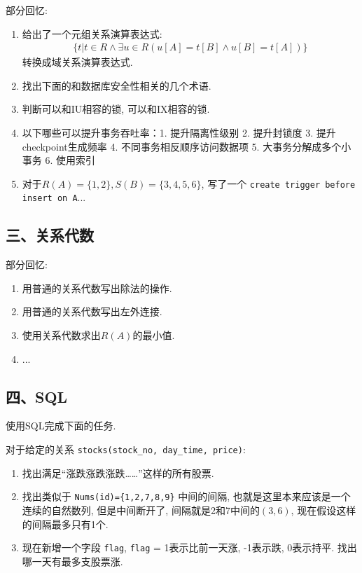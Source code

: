 部分回忆:
\begin{enumerate}
    \item 给出了一个元组关系演算表达式:
    \begin{align*}
        \{t|t\in R \land \exists u \in R(u[A]=t[B]\land u[B]=t[A])\}
    \end{align*}
    转换成域关系演算表达式.
    \item 找出下面的和数据库安全性相关的几个术语.
    \item 判断可以和IU相容的锁, 可以和IX相容的锁.
    \item 以下哪些可以提升事务吞吐率：1. 提升隔离性级别 2. 提升封锁度 3. 提升checkpoint生成频率 4. 不同事务相反顺序访问数据项 5. 大事务分解成多个小事务 6. 使用索引
    \item 对于$R(A)=\{1,2\}, S(B)=\{3,4,5,6\}$, 写了一个 \verb|create trigger before insert on A|...
\end{enumerate}

\subsection{三、关系代数}

部分回忆:
\begin{enumerate}
    \item 用普通的关系代数写出除法的操作.
    \item 用普通的关系代数写出左外连接.
    \item 使用关系代数求出$R(A)$的最小值.
    \item ...
\end{enumerate}

\subsection{四、SQL}

使用SQL完成下面的任务.

对于给定的关系 \verb|stocks(stock_no, day_time, price)|:
\begin{enumerate}
    \item 找出满足“涨跌涨跌涨跌……”这样的所有股票.
    \item 找出类似于 \verb|Nums(id)={1,2,7,8,9}| 中间的间隔, 也就是这里本来应该是一个连续的自然数列, 但是中间断开了, 间隔就是2和7中间的$(3,6)$, 现在假设这样的间隔最多只有1个.
    \item 现在新增一个字段 \verb|flag|, \verb|flag| = 1表示比前一天涨, -1表示跌, 0表示持平. 找出哪一天有最多支股票涨.
\end{enumerate}

